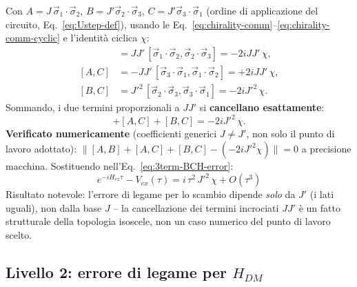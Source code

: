 \documentclass[11pt,a4paper]{article}
\begin{document}
Con $A=J\,\vec\sigma_1\!\cdot\!\vec\sigma_2$, $B=J'\vec\sigma_2\!\cdot\!\vec\sigma_3$, $C=J'\vec\sigma_3\!\cdot\!\vec\sigma_1$ (ordine di applicazione del circuito, Eq.~\eqref{eq:Ustep-def}), usando le Eq.~\eqref{eq:chirality-comm}--\eqref{eq:chirality-comm-cyclic} e l'identità ciclica $\chi$:
\begin{align}
[A,B] &= JJ'\,[\vec\sigma_1\!\cdot\!\vec\sigma_2,\vec\sigma_2\!\cdot\!\vec\sigma_3] = -2iJJ'\,\chi,\\
[A,C] &= -J J'\,[\vec\sigma_3\!\cdot\!\vec\sigma_1,\vec\sigma_1\!\cdot\!\vec\sigma_2] = +2iJJ'\,\chi,\\
[B,C] &= J'^2\,[\vec\sigma_2\!\cdot\!\vec\sigma_3,\vec\sigma_3\!\cdot\!\vec\sigma_1] = -2iJ'^2\,\chi.
\end{align}
Sommando, i due termini proporzionali a $JJ'$ si \textbf{cancellano esattamente}:
\begin{equation}
[A,B]+[A,C]+[B,C] = -2iJ'^2\,\chi.
\label{eq:sum-comm-Hex}
\end{equation}
\textbf{Verificato numericamente} (coefficienti generici $J\neq J'$, non solo il punto di lavoro adottato): $\|[A,B]+[A,C]+[B,C]-(-2iJ'^2\chi)\|=0$ a precisione macchina. Sostituendo nell'Eq.~\eqref{eq:3term-BCH-error}:
\begin{equation}
\boxed{e^{-iH_{ex}\tau} - V_{ex}(\tau) = i\,\tau^2\,J'^2\,\chi + O(\tau^3)}
\label{eq:error-Hex-final}
\end{equation}
Risultato notevole: l'errore di legame per lo scambio dipende \emph{solo} da $J'$ (i lati uguali), non dalla base $J$ -- la cancellazione dei termini incrociati $JJ'$ è un fatto strutturale della topologia isoscele, non un caso numerico del punto di lavoro scelto.

\subsection{Livello 2: errore di legame per $H_{DM}$}
\end{document}
